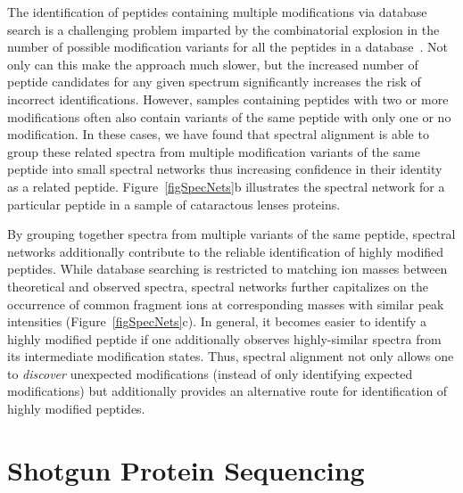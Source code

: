 \documentclass[8.5pt,twoside,twocolumn]{article}
\begin{document}
The identification of peptides containing multiple modifications via database search is a challenging problem imparted by the combinatorial explosion in the number of possible modification variants for all the peptides in a database~\cite{tsur05,na11}. Not only can this make the approach much slower, but the increased number of peptide candidates for any given spectrum significantly increases the risk of incorrect identifications. However, samples containing peptides with two or more modifications often also contain variants of the same peptide with only one or no modification. In these cases, we have found that spectral alignment is able to group these related spectra from multiple modification variants of the same peptide into small spectral networks thus increasing confidence in their identity as a related peptide. Figure~\ref{figSpecNets}b illustrates the spectral network for a particular peptide in a sample of cataractous lenses proteins.

By grouping together spectra from multiple variants of the same peptide, spectral networks additionally contribute to the reliable identification of highly modified peptides. While database searching is restricted to matching ion masses between theoretical and observed spectra, spectral networks further capitalizes on the occurrence of common fragment ions at corresponding masses with similar peak intensities (Figure~\ref{figSpecNets}c). In general, it becomes easier to identify a highly modified peptide if one additionally observes highly-similar spectra from its intermediate modification states. Thus, spectral alignment not only allows one to \emph{discover} unexpected modifications (instead of only identifying expected modifications) but additionally provides an alternative route for identification of highly modified peptides.

\section{Shotgun Protein Sequencing}
\end{document}
